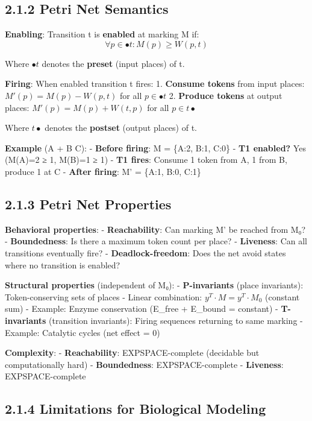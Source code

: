 \hypertarget{petri-net-semantics}{%
\subsection{2.1.2 Petri Net Semantics}\label{petri-net-semantics}}

\textbf{Enabling}: Transition t is \textbf{enabled} at marking M if: \[
\forall p \in \bullet t: M(p) \geq W(p,t)
\]

Where \(\bullet t\) denotes the \textbf{preset} (input places) of t.

\textbf{Firing}: When enabled transition t fires: 1. \textbf{Consume
tokens} from input places: \(M'(p) = M(p) - W(p,t)\) for all
\(p \in \bullet t\) 2. \textbf{Produce tokens} at output places:
\(M'(p) = M(p) + W(t,p)\) for all \(p \in t\bullet\)

Where \(t\bullet\) denotes the \textbf{postset} (output places) of t.

\textbf{Example} (A + B \textrightarrow C): - \textbf{Before firing}: M = \{A:2, B:1,
C:0\} - \textbf{T1 enabled?} Yes (M(A)=2 ≥ 1, M(B)=1 ≥ 1) - \textbf{T1
fires}: Consume 1 token from A, 1 from B, produce 1 at C - \textbf{After
firing}: M' = \{A:1, B:0, C:1\}

\hypertarget{petri-net-properties}{%
\subsection{2.1.3 Petri Net Properties}\label{petri-net-properties}}

\textbf{Behavioral properties}: - \textbf{Reachability}: Can marking M'
be reached from M₀? - \textbf{Boundedness}: Is there a maximum token
count per place? - \textbf{Liveness}: Can all transitions eventually
fire? - \textbf{Deadlock-freedom}: Does the net avoid states where no
transition is enabled?

\textbf{Structural properties} (independent of M₀): -
\textbf{P-invariants} (place invariants): Token-conserving sets of
places - Linear combination: \(y^T \cdot M = y^T \cdot M_0\) (constant
sum) - Example: Enzyme conservation (E\_free + E\_bound = constant) -
\textbf{T-invariants} (transition invariants): Firing sequences
returning to same marking - Example: Catalytic cycles (net effect = 0)

\textbf{Complexity}: - \textbf{Reachability}: EXPSPACE-complete
(decidable but computationally hard) - \textbf{Boundedness}:
EXPSPACE-complete - \textbf{Liveness}: EXPSPACE-complete

\hypertarget{limitations-for-biological-modeling}{%
\subsection{2.1.4 Limitations for Biological
Modeling}\label{limitations-for-biological-modeling}}

